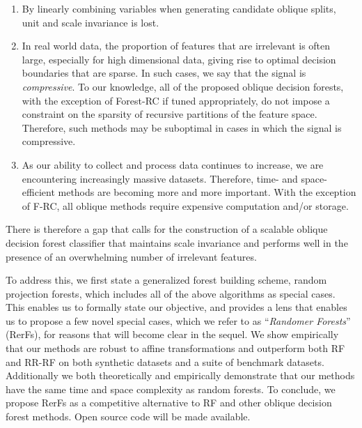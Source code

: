 \documentclass{article}
\begin{document}
\begin{enumerate}
\item By linearly combining variables when generating candidate oblique splits, unit and scale invariance is lost.
\item In real world data, the proportion of features that are irrelevant is often large, especially for high dimensional data, giving rise to optimal decision boundaries that are sparse. In such cases, we say that the signal is \emph{compressive}. To our knowledge, all of the proposed oblique decision forests, with the exception of Forest-RC if tuned appropriately, do not impose a constraint on the sparsity of recursive partitions of the feature space. Therefore, such methods may be suboptimal in cases in which the signal is compressive.
\item As our ability to collect and process data continues to increase, we are encountering increasingly massive datasets. Therefore, time- and space-efficient methods are becoming more and more important. With the exception of F-RC, all oblique methods require expensive computation and/or storage.
\end{enumerate}

There is therefore a gap that calls for the construction of a scalable oblique decision forest classifier that maintains scale invariance and performs well in the presence of an overwhelming number of irrelevant features. 

To address this, we first state a generalized forest building scheme, random projection forests, which includes all of the above algorithms as special cases. This enables us to formally state our objective, and provides a lens that enables us to propose a few novel special cases, which we refer to as ``{\em{Randomer Forests}}'' (RerFs), for reasons that will become clear in the sequel. We show empirically that our methods are robust to affine transformations and outperform both RF and RR-RF on both synthetic datasets and a suite of benchmark datasets. Additionally we both theoretically and empirically demonstrate that our methods have the same time and space complexity as random forests. To conclude, we propose RerFs as a competitive alternative to RF and other oblique decision forest methods. Open source code will be made available.
\end{document}
